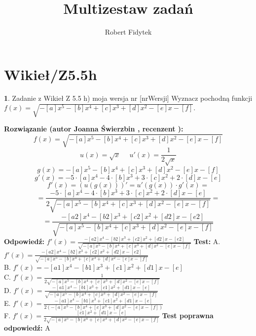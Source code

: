 \documentclass[12pt, a4paper]{article}
\title{Multizestaw zadań}
\author{Robert Fidytek}
\date{}
\theoremstyle{definition} %
\newtheorem{zad}{}
\newcommand{\kategoria}[1]{\section{#1}} %
\newcommand{\zadStart}[1]{\begin{zad}#1\newline} %
\newcommand{\zadStop}{\end{zad}}   %
\newcommand{\rozwStart}[2]{\noindent \textbf{Rozwiązanie (autor #1 , recenzent #2): }\newline} %
\newcommand{\rozwStop}{\newline}                                            %
\newcommand{\odpStart}{\noindent \textbf{Odpowiedź:}\newline}    %
\newcommand{\odpStop}{\newline}                                             %
\newcommand{\testStart}{\noindent \textbf{Test:}\newline} %
\newcommand{\testStop}{\newline} %
\newcommand{\kluczStart}{\noindent \textbf{Test poprawna odpowiedź:}\newline} %
\newcommand{\kluczStop}{\newline} %
\begin{document}
\maketitle


\kategoria{Wikieł/Z5.5h}
\zadStart{Zadanie z Wikieł Z 5.5 h) moja wersja nr [nrWersji]}
Wyznacz pochodną funkcji \\ $f(x)=\sqrt{-[a]x^5-[b]x^4+[c]x^3+[d]x^2-[e]x-[f]} $.
\zadStop
\rozwStart{Joanna Świerzbin}{}
$$f(x)=\sqrt{-[a]x^5-[b]x^4+[c]x^3+[d]x^2-[e]x-[f]} $$
$$u(x)=\sqrt{x} \ \ \ \ \ \ u'(x)=\frac{1}{2\sqrt{x}}$$
$$g(x)=-[a]x^5-[b]x^4+[c]x^3+[d]x^2-[e]x-[f] $$ $$ g'(x)=-5\cdot [a]x^4-4\cdot[b]x^3+3\cdot[c]x^2+2\cdot[d]x-[e]$$
$$f'(x)=(u(g(x)))'=u'(g(x))\cdot g'(x) = $$
 $$= \frac{-5\cdot [a]x^4-4\cdot[b]x^3+3\cdot[c]x^2+2\cdot[d]x-[e]}{2\sqrt{-[a]x^5-[b]x^4+[c]x^3+[d]x^2-[e]x-[f]}}=$$
 $$= \frac{-[a2]x^4-[b2]x^3+[c2]x^2+[d2]x-[e2]}{\sqrt{-[a]x^5-[b]x^4+[c]x^3+[d]x^2-[e]x-[f]}}$$
\rozwStop
\odpStart
$ f'(x) = \frac{-[a2]x^4-[b2]x^3+[c2]x^2+[d2]x-[e2]}{\sqrt{-[a]x^5-[b]x^4+[c]x^3+[d]x^2-[e]x-[f]}}$
\odpStop
\testStart
A. $ f'(x) = \frac{-[a2]x^4-[b2]x^3+[c2]x^2+[d2]x-[e2]}{\sqrt{-[a]x^5-[b]x^4+[c]x^3+[d]x^2-[e]x-[f]}}$\\
B. $ f'(x) = {-[a1]x^4-[b1]x^3+[c1]x^2+[d1]x-[e]}$ \\
C. $ f'(x) = \frac{1}{2\sqrt{-[a]x^5-[b]x^4+[c]x^3+[d]x^2-[e]x-[f]}}$ \\
D. $ f'(x) = \frac{-[a1]x^4-[b1]x^3+[c1]x^2+[d1]x-[e]}{\sqrt{-[a]x^5-[b]x^4+[c]x^3+[d]x^2-[e]x-[f]}}$\\
E. $ f'(x) = \frac{-[a1]x^4-[b1]x^3+[c1]x^2+[d1]x-[e]}{2(-[a]x^5-[b]x^4+[c]x^3+[d]x^2-[e]x-[f])}$\\
F. $ f'(x) = \frac{[c1]x^2+[d1]x-[e]}{2\sqrt{-[a]x^5-[b]x^4+[c]x^3+[d]x^2-[e]x-[f]}}$
\testStop
\kluczStart
A
\kluczStop
\end{document}
